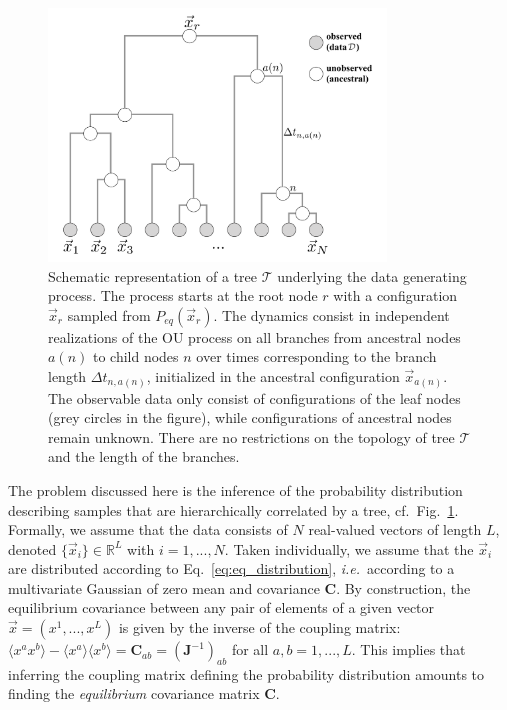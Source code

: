 \documentclass[preprint,amsmath,amssymb,superscriptaddress,showpacs,pre]{revtex4-1}
\newcommand{\ie}{\emph{i.e.}}
\def\vx{\vec x}
\begin{document}
\begin{figure}[!htb]
	\includegraphics[width=0.8\textwidth]{Figures/tree.pdf}
	\caption{Schematic representation of a tree $\mathcal{T}$ underlying the data generating process. The process starts at the root node $r$ with a configuration $\vx_r$ sampled from $P_{eq}(\vx_r)$. The dynamics consist in independent realizations of the OU process on all branches from ancestral nodes $a(n)$ to child nodes $n$ over times corresponding to the branch length $\Delta t_{n,a(n)}$, initialized in the ancestral configuration $\vx_{a(n)}$. The observable data only consist of configurations of the leaf nodes (grey circles in the figure), while configurations of ancestral nodes remain unknown. There are no restrictions on the topology of tree $\mathcal{T}$ and the length of the branches.}
	\label{fig:sample_tree}
\end{figure}


The problem discussed here is the inference of the probability distribution describing samples that are hierarchically correlated by a tree, cf.~Fig.~\ref{fig:sample_tree}. 
Formally, we assume that the data consists of $N$ real-valued vectors of length $L$, denoted $\{\vx_i\}\in\mathbb{R}^L$ with $i=1,...,N$. 
Taken individually, we assume that the $\vx_i$ are distributed according to Eq.~\eqref{eq:eq_distribution}, \ie~according to a multivariate Gaussian of zero mean and covariance $\bm C$.
By construction, the equilibrium covariance between any pair of elements of a given vector $\vx=(x^1,...,x^L)$ is given by the inverse of the coupling matrix: $\langle x^a x^b\rangle-\langle x^a\rangle\langle x^b\rangle = \bm C_{ab} = (\bm J^{-1})_{ab}$ for all $a,b=1,...,L$. 
This implies that inferring the coupling matrix defining the probability distribution amounts to finding the \emph{equilibrium} covariance matrix $\mathbf{C}$.  
\end{document}
